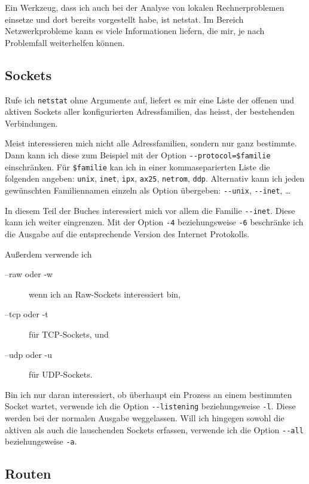 \begin{normaltext}
  Ein Werkzeug, dass ich auch bei der Analyse von lokalen Rechnerproblemen
  einsetze und dort bereits vorgestellt habe, ist netstat. Im Bereich
  Netzwerkprobleme kann es viele Informationen liefern, die mir, je nach
  Problemfall weiterhelfen können.

  \subsection*{Sockets}
  \label{sec:netz-werkzeuge-netstat-sockets}

  Rufe ich \verb?netstat? ohne Argumente auf, liefert es mir eine Liste der
  offenen und aktiven Sockets aller konfigurierten Adressfamilien, das
  heisst, der bestehenden Verbindungen.

  Meist interessieren mich nicht alle Adressfamilien, sondern nur ganz
  bestimmte. Dann kann ich diese zum Beispiel mit der Option
  \verb?--protocol=$familie? einschränken. Für \verb?$familie? kan ich in
  einer kommaseparierten Liste die folgenden angeben: \verb?unix?,
  \verb?inet?, \verb?ipx?, \verb?ax25?, \verb?netrom?, \verb?ddp?. Alternativ
  kann ich jeden gewünschten Familiennamen einzeln als Option übergeben:
  \verb?--unix?, \verb?--inet?, \ldots

  In diesem Teil der Buches interessiert mich vor allem die Familie
  \verb?--inet?. Diese kann ich weiter eingrenzen. Mit der Option \verb?-4?
  beziehungsweise \verb?-6? beschränke ich die Ausgabe auf die entsprechende
  Version des Internet Protokolls.

  Außerdem verwende ich
  \begin{description}
    \item[--raw oder -w] wenn ich an Raw-Sockets interessiert bin,
    \item[--tcp oder -t] für TCP-Sockets, und
    \item[--udp oder -u] für UDP-Sockets.
  \end{description}

  Bin ich nur daran interessiert, ob überhaupt ein Prozess an einem bestimmten
  Socket wartet, verwende ich die Option \verb?--listening? beziehungsweise
  \verb?-l?. Diese werden bei der normalen Ausgabe weggelassen. Will ich
  hingegen sowohl die aktiven als auch die lauschenden Sockets erfassen,
  verwende ich die Option \verb?--all? beziehungsweise \verb?-a?.

  \subsection*{Routen}
  \label{sec:netz-werkzeuge-netstat-routen}


\end{normaltext}
